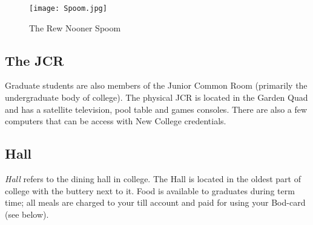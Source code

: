 \begin{figure}[htbp]
\centering
\texttt{[image: Spoom.jpg]}
\caption[]{The Rew Nooner Spoom}
\label{fig:Spoom}
\end{figure}

\subsection{The JCR}

Graduate students are also members of the Junior Common Room (primarily the undergraduate body of college). The physical JCR is located in the Garden Quad and has a satellite television, pool table and games consoles. There are also a few computers that can be access with New College credentials.
\subsection{Hall}

\emph{Hall} refers to the dining hall in college. The Hall is located in the oldest
part of college with the buttery next to it. Food is available to graduates during term time; all meals are charged to your till account and paid for using your Bod-card (see below). 

\smallskip

